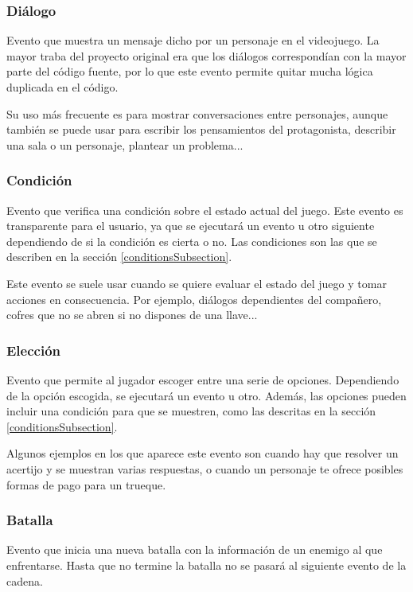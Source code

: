 \subsubsection{Diálogo}
Evento que muestra un mensaje dicho por un personaje en el videojuego. La mayor traba del proyecto original era que los diálogos correspondían con la mayor parte del código fuente, por lo que este evento permite quitar mucha lógica duplicada en el código.

Su uso más frecuente es para mostrar conversaciones entre personajes, aunque también se puede usar para escribir los pensamientos del protagonista, describir una sala o un personaje, plantear un problema...

\subsubsection{Condición}
Evento que verifica una condición sobre el estado actual del juego. Este evento es transparente para el usuario, ya que se ejecutará un evento u otro siguiente dependiendo de si la condición es cierta o no. Las condiciones son las que se describen en la sección \ref{conditionsSubsection}.

Este evento se suele usar cuando se quiere evaluar el estado del juego y tomar acciones en consecuencia. Por ejemplo, diálogos dependientes del compañero, cofres que no se abren si no dispones de una llave...

\subsubsection{Elección}
Evento que permite al jugador escoger entre una serie de opciones. Dependiendo de la opción escogida, se ejecutará un evento u otro. Además, las opciones pueden incluir una condición para que se muestren, como las descritas en la sección \ref{conditionsSubsection}.

Algunos ejemplos en los que aparece este evento son cuando hay que resolver un acertijo y se muestran varias respuestas, o cuando un personaje te ofrece posibles formas de pago para un trueque.

\subsubsection{Batalla} \label{battleDesignSubsection}
Evento que inicia una nueva batalla con la información de un enemigo al que enfrentarse.
Hasta que no termine la batalla no se pasará al siguiente evento de la cadena.

